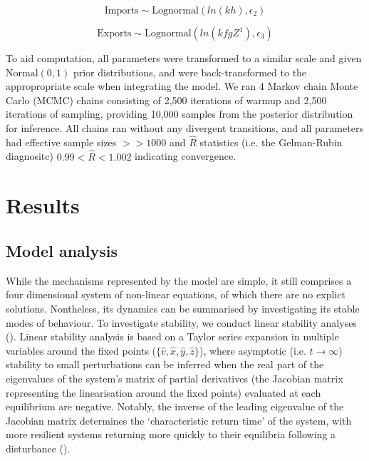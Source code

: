 \documentclass[12pt]{article}
\begin{document}
\begin{equation}
  \text{Imports} \sim \text{Lognormal}( ln( k h ), \epsilon_{2})
\end{equation}

\begin{equation}
  \text{Exports} \sim \text{Lognormal}( ln( k f g Z^{1} ), \epsilon_{3})
\end{equation}


To aid computation, all parameters were transformed to a similar scale and given $\text{Normal}(0, 1)$ prior distributions, and were back-transformed to the appropropriate scale when integrating the model. We ran 4 Markov chain Monte Carlo (MCMC) chains consisting of 2,500 iterations of warmup and 2,500 iterations of sampling, providing 10,000 samples from the posterior distribution for inference. All chains ran without any divergent transitions, and all parameters had effective sample sizes $>> 1000$ and $\hat{R}$ statistics (i.e. the Gelman-Rubin diagnositc) $0.99 < \hat{R} < 1.002$ indicating convergence.


\section{Results}

\subsection{Model analysis}
While the mechanisms represented by the model are simple, it still comprises a four dimensional system of non-linear equations, of which there are no explict solutions. Nontheless, its dynamics can be summarised by investigating its stable modes of behaviour. To investigate stability, we conduct linear stability analyses (\cite{strogatz1994}). Linear stability analysis is based on a Taylor series expansion in multiple variables around the fixed points ($\{\hat{v}, \hat{x}, \hat{y}, \hat{z}\}$), where asymptotic (i.e. $t \rightarrow \infty$) stability to small perturbations can be inferred when the real part of the eigenvalues of the system's matrix of partial derivatives (the Jacobian matrix representing the linearisation around the fixed points) evaluated at each equilibrium are negative. Notably, the inverse of the leading eigenvalue of the Jacobian matrix determines the `characteristic return time' of the system, with more resilient systems returning more quickly to their equilibria following a disturbance (\cite{pimm1984}).
\end{document}
